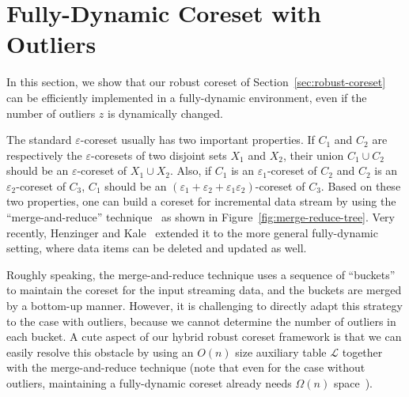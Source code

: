 \section{Fully-Dynamic Coreset with Outliers}
\label{sec-appdynamic}


In this section, we show that our robust coreset of Section~\ref{sec:robust-coreset} can be efficiently implemented in a fully-dynamic environment, even if the number of outliers $z$ is dynamically changed. 



The standard $ \varepsilon $-coreset usually has two important properties. 
If $ C_1 $ and $ C_2 $ are respectively the $ \varepsilon $-coresets of two disjoint sets $ X_1 $ and $ X_2 $, their union $ C_1\cup C_2 $ should be an $ \varepsilon$-coreset of $ X_1\cup X_2 $. Also, 
if $ C_1 $ is an $ \varepsilon_1$-coreset of $ C_2 $ and $ C_2 $ is an $ \varepsilon_2$-coreset of $ C_3 $,  $ C_1 $ should be an $ (\varepsilon_1+\varepsilon_2+\varepsilon_1\varepsilon_2) $-coreset of $ C_3 $. Based on these two properties, one can build a coreset for incremental data stream by using the ``merge-and-reduce'' technique~\cite{BentleyS80,Har-PeledM04} as shown in Figure~\ref{fig:merge-reduce-tree}. Very recently, Henzinger and Kale~\cite{HenzingerK20} extended it to the more general fully-dynamic setting, where data items can be deleted and updated as well.


Roughly speaking, the merge-and-reduce technique uses a sequence of ``buckets'' to maintain the coreset for the input streaming data, and the buckets are merged by a bottom-up manner. However, it is challenging to directly adapt this strategy to the case with outliers, because we cannot determine the number of outliers in each bucket. 
A cute aspect of our hybrid robust coreset framework is that we can easily resolve this obstacle by using an $O(n)$ size auxiliary table $\mathscr{L}$ together with the merge-and-reduce technique (note that even for the case without outliers, maintaining a fully-dynamic coreset already needs $\Omega(n)$ space~\cite{HenzingerK20}). 

